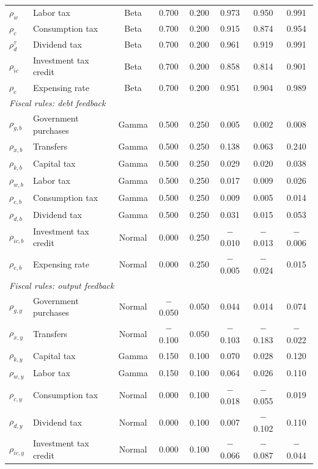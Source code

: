 {\begin{longtable}{llcccccc}
$\rho_w$ & Labor tax & Beta & 0.700 & 0.200 & 0.973 & 0.950 & 0.991 \\
$\rho_c$ & Consumption tax & Beta & 0.700 & 0.200 & 0.915 & 0.874 & 0.954 \\
$\rho_d^{\tau}$ & Dividend tax & Beta & 0.700 & 0.200 & 0.961 & 0.919 & 0.991 \\
$\rho_{ic}$ & Investment tax credit & Beta & 0.700 & 0.200 & 0.858 & 0.814 & 0.901 \\
$\rho_e$ & Expensing rate & Beta & 0.700 & 0.200 & 0.951 & 0.904 & 0.989 \\
\multicolumn{8}{l}{\textit{Fiscal rules: debt feedback}} \\
$\rho_{g,b}$ & Government purchases & Gamma & 0.500 & 0.250 & 0.005 & 0.002 & 0.008 \\
$\rho_{x,b}$ & Transfers & Gamma & 0.500 & 0.250 & 0.138 & 0.063 & 0.240 \\
$\rho_{k,b}$ & Capital tax & Gamma & 0.500 & 0.250 & 0.029 & 0.020 & 0.038 \\
$\rho_{w,b}$ & Labor tax & Gamma & 0.500 & 0.250 & 0.017 & 0.009 & 0.026 \\
$\rho_{c,b}$ & Consumption tax & Gamma & 0.500 & 0.250 & 0.009 & 0.005 & 0.014 \\
$\rho_{d,b}$ & Dividend tax & Gamma & 0.500 & 0.250 & 0.031 & 0.015 & 0.053 \\
$\rho_{ic,b}$ & Investment tax credit & Normal & 0.000 & 0.250 & $-$0.010 & $-$0.013 & $-$0.006 \\
$\rho_{e,b}$ & Expensing rate & Normal & 0.000 & 0.250 & $-$0.005 & $-$0.024 & 0.015 \\
\multicolumn{8}{l}{\textit{Fiscal rules: output feedback}} \\
$\rho_{g,y}$ & Government purchases & Normal & $-$0.050 & 0.050 & 0.044 & 0.014 & 0.074 \\
$\rho_{x,y}$ & Transfers & Normal & $-$0.100 & 0.050 & $-$0.103 & $-$0.183 & $-$0.022 \\
$\rho_{k,y}$ & Capital tax & Gamma & 0.150 & 0.100 & 0.070 & 0.028 & 0.120 \\
$\rho_{w,y}$ & Labor tax & Gamma & 0.150 & 0.100 & 0.064 & 0.026 & 0.110 \\
$\rho_{c,y}$ & Consumption tax & Normal & 0.000 & 0.100 & $-$0.018 & $-$0.055 & 0.019 \\
$\rho_{d,y}$ & Dividend tax & Normal & 0.000 & 0.100 & 0.007 & $-$0.102 & 0.110 \\
$\rho_{ic,y}$ & Investment tax credit & Normal & 0.000 & 0.100 & $-$0.066 & $-$0.087 & $-$0.044 \\

\end{longtable}}
